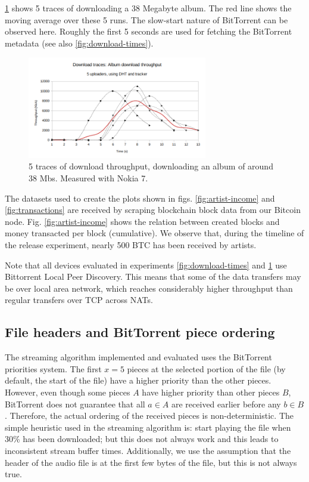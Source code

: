 \ref{fig:download-traces} shows 5 traces of downloading a 38 Megabyte album. The red line shows the moving average over these 5 runs. The slow-start nature of BitTorrent can be observed here. Roughly the first 5 seconds are used for fetching the BitTorrent metadata (see also \ref{fig:download-times}).

\begin{figure}
    \centering
    \includegraphics[width=0.7\textwidth]{evaluation/download-traces.png}
    \caption{5 traces of download throughput, downloading an album of around 38 Mbs. Measured with Nokia 7.}
    \label{fig:download-traces}
\end{figure}

The datasets used to create the plots shown in figs. \ref{fig:artist-income} and \ref{fig:transactions} are received by scraping blockchain block data from our Bitcoin node. Fig. \ref{fig:artist-income} shows the relation between created blocks and money transacted per block (cumulative). We observe that, during the timeline of the release experiment, nearly 500 BTC has been received by artists.

Note that all devices evaluated in experiments \ref{fig:download-times} and \ref{fig:download-traces} use Bittorrent Local Peer Discovery. This means that some of the data transfers may be over local area network, which reaches considerably higher throughput than regular transfers over TCP across NATs.

\subsection{File headers and BitTorrent piece ordering}
The streaming algorithm implemented and evaluated uses the BitTorrent priorities system. The first $x=5$ pieces at the selected portion of the file (by default, the start of the file) have a higher priority than the other pieces. However, even though some pieces $A$ have higher priority than other pieces $B$, BitTorrent does not guarantee that all $a\in A$ are received earlier before any $b\in B$. Therefore, the actual ordering of the received pieces is non-deterministic. The simple heuristic used in the streaming algorithm is: start playing the file when 30\% has been downloaded; but this does not always work and this leads to inconsistent stream buffer times. Additionally, we use the assumption that the header of the audio file is at the first few bytes of the file, but this is not always true.

